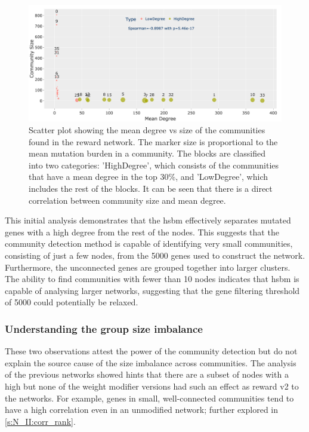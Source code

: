 \begin{figure}[!b]    
    \centering
    \includegraphics[width=1.0\textwidth,height=1.0\textheight,keepaspectratio]{Sections/Network_II/resources/reward/LargeSmall_com.png}
    \caption[Community size vs Degree]{Scatter plot showing the mean degree vs size of the communities found in the reward network. The marker size is proportional to the mean mutation burden in a community. The blocks are classified into two categories: 'HighDegree', which consists of the communities that have a mean degree in the top 30\%, and 'LowDegree', which includes the rest of the blocks. It can be seen that there is a direct correlation between community size and mean degree.}
    \label{fig:N_II:largeSmall_com}
\end{figure}

This initial analysis demonstrates that the \acrfull{hsbm} effectively separates mutated genes with a high degree from the rest of the nodes. This suggests that the community detection method is capable of identifying very small communities, consisting of just a few nodes, from the 5000 genes used to construct the network. Furthermore, the unconnected genes are grouped together into larger clusters. The ability to find communities with fewer than 10 nodes indicates that \acrshort{hsbm} is capable of analysing larger networks, suggesting that the gene filtering threshold of 5000 could potentially be relaxed.

\subsubsection*{Understanding the group size imbalance}

These two observations attest the power of the community detection but do not explain the source cause of the size imbalance across communities. The analysis of the previous networks showed hints that there are a subset of nodes with a high but none of the weight modifier versions had such an effect as reward v2 to the networks. For example, genes in small, well-connected communities tend to have a high correlation even in an unmodified network; further explored in \cref{s:N_II:corr_rank}. 

